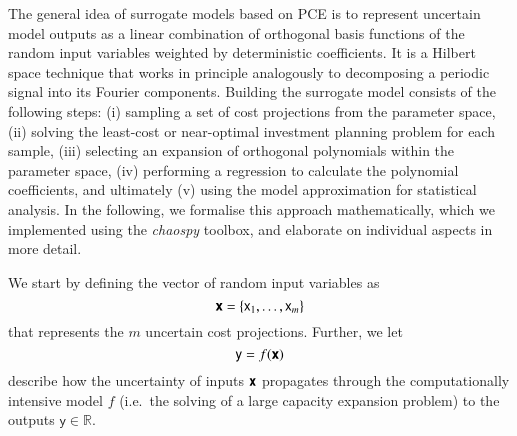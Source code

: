 
The general idea of surrogate models based on PCE is to represent uncertain
model outputs as a linear combination of orthogonal basis functions of the
random input variables weighted by deterministic
coefficients.\cite{muhlpfordt_uncertainty_2020} It is a Hilbert space technique
that works in principle analogously to decomposing a periodic signal into its
Fourier components.\cite{muhlpfordt_uncertainty_2020} Building the surrogate
model consists of the following steps: (i) sampling a set of cost projections
from the parameter space, (ii) solving the least-cost or near-optimal investment
planning problem for each sample, (iii) selecting an expansion of orthogonal
polynomials within the parameter space, (iv) performing a regression to
calculate the polynomial coefficients, and ultimately (v) using the model
approximation for statistical analysis. In the following, we formalise this
approach mathematically, which we implemented using the \textit{chaospy}
toolbox,\cite{feinberg_chaospy_2015} and elaborate on individual aspects in more
detail.

We start by defining the vector of random input variables as
\begin{equation}
    \boldsymbol{\mathsf{x}} = \{\mathsf{x}_1, \dots , \mathsf{x}_m\}
\end{equation}
that represents the $m$ uncertain cost projections. Further, we let
\begin{equation}
    \mathsf{y} = f(\boldsymbol{\mathsf{x}})
\end{equation}
describe how the uncertainty of inputs $\boldsymbol{\mathsf{x}}$ propagates through the
computationally intensive model $f$ (i.e.~the solving of a large capacity
expansion problem) to the outputs $\mathsf{y} \in \mathbb{R}$.

